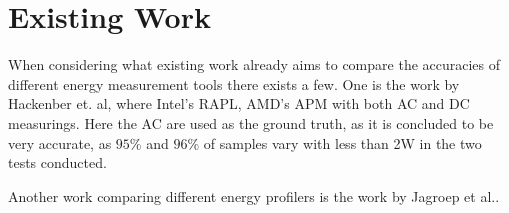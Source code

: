 
\section{Existing Work}

When considering what existing work already aims to compare the accuracies of different energy measurement tools there exists a few. One is the work by Hackenber et. al\cite*[]{Hackenberg2013}, where Intel's RAPL, AMD's APM with both AC and DC measurings. Here the AC are used as the ground truth, as it is concluded to be very accurate, as $95\%$ and $96\%$ of samples vary with less than 2W in the two tests conducted.

Another work comparing different energy profilers is the work by Jagroep et al.\cite[]{Jagroep2015}.